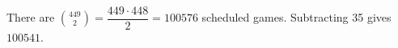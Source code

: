 There are $\binom{449}{2}=\dfrac{449\cdot448}{2}=100576$ scheduled games. Subtracting 35 gives $\boxed{100541}$.

